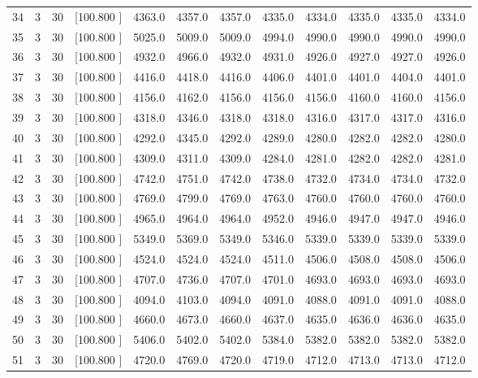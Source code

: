 \documentclass[12pt,a4paper]{article}
\begin{document}
\begin{center}
{\begin{tabular}{r r r r r r r r r r r r}
  34&  3& 30&[100.800   ]&  4363.0&  4357.0&  4357.0&  4335.0&  4334.0&  4335.0&  4335.0&  4334.0\\[-0.02in]
  35&  3& 30&[100.800   ]&  5025.0&  5009.0&  5009.0&  4994.0&  4990.0&  4990.0&  4990.0&  4990.0\\[-0.02in]
  36&  3& 30&[100.800   ]&  4932.0&  4966.0&  4932.0&  4931.0&  4926.0&  4927.0&  4927.0&  4926.0\\[-0.02in]
  37&  3& 30&[100.800   ]&  4416.0&  4418.0&  4416.0&  4406.0&  4401.0&  4401.0&  4404.0&  4401.0\\[-0.02in]
  38&  3& 30&[100.800   ]&  4156.0&  4162.0&  4156.0&  4156.0&  4156.0&  4160.0&  4160.0&  4156.0\\[-0.02in]
  39&  3& 30&[100.800   ]&  4318.0&  4346.0&  4318.0&  4318.0&  4316.0&  4317.0&  4317.0&  4316.0\\[-0.02in]
  40&  3& 30&[100.800   ]&  4292.0&  4345.0&  4292.0&  4289.0&  4280.0&  4282.0&  4282.0&  4280.0\\[-0.02in]
  41&  3& 30&[100.800   ]&  4309.0&  4311.0&  4309.0&  4284.0&  4281.0&  4282.0&  4282.0&  4281.0\\[-0.02in]
  42&  3& 30&[100.800   ]&  4742.0&  4751.0&  4742.0&  4738.0&  4732.0&  4734.0&  4734.0&  4732.0\\[-0.02in]
  43&  3& 30&[100.800   ]&  4769.0&  4799.0&  4769.0&  4763.0&  4760.0&  4760.0&  4760.0&  4760.0\\[-0.02in]
  44&  3& 30&[100.800   ]&  4965.0&  4964.0&  4964.0&  4952.0&  4946.0&  4947.0&  4947.0&  4946.0\\[-0.02in]
  45&  3& 30&[100.800   ]&  5349.0&  5369.0&  5349.0&  5346.0&  5339.0&  5339.0&  5339.0&  5339.0\\[-0.02in]
  46&  3& 30&[100.800   ]&  4524.0&  4524.0&  4524.0&  4511.0&  4506.0&  4508.0&  4508.0&  4506.0\\[-0.02in]
  47&  3& 30&[100.800   ]&  4707.0&  4736.0&  4707.0&  4701.0&  4693.0&  4693.0&  4693.0&  4693.0\\[-0.02in]
  48&  3& 30&[100.800   ]&  4094.0&  4103.0&  4094.0&  4091.0&  4088.0&  4091.0&  4091.0&  4088.0\\[-0.02in]
  49&  3& 30&[100.800   ]&  4660.0&  4673.0&  4660.0&  4637.0&  4635.0&  4636.0&  4636.0&  4635.0\\[-0.02in]
  50&  3& 30&[100.800   ]&  5406.0&  5402.0&  5402.0&  5384.0&  5382.0&  5382.0&  5382.0&  5382.0\\[-0.02in]
  51&  3& 30&[100.800   ]&  4720.0&  4769.0&  4720.0&  4719.0&  4712.0&  4713.0&  4713.0&  4712.0\\[-0.02in]

\end{tabular}}
\end{center}
\end{document}
